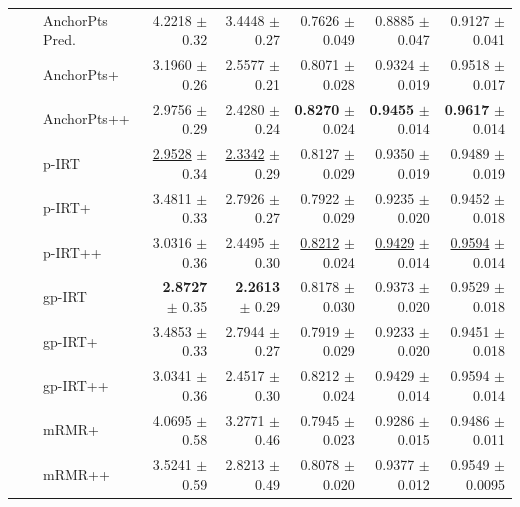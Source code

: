\begin{longtable}{llp{}rrrrr}
 &  & AnchorPts Pred. & 4.2218 {\scriptsize $\pm$ 0.32} & 3.4448 {\scriptsize $\pm$ 0.27} & 0.7626 {\scriptsize $\pm$ 0.049} & 0.8885 {\scriptsize $\pm$ 0.047} & 0.9127 {\scriptsize $\pm$ 0.041} \\
 &  & AnchorPts+ & 3.1960 {\scriptsize $\pm$ 0.26} & 2.5577 {\scriptsize $\pm$ 0.21} & 0.8071 {\scriptsize $\pm$ 0.028} & 0.9324 {\scriptsize $\pm$ 0.019} & 0.9518 {\scriptsize $\pm$ 0.017} \\
 &  & AnchorPts++ & 2.9756 {\scriptsize $\pm$ 0.29} & 2.4280 {\scriptsize $\pm$ 0.24} & \textbf{0.8270} {\scriptsize $\pm$ 0.024} & \textbf{0.9455} {\scriptsize $\pm$ 0.014} & \textbf{0.9617} {\scriptsize $\pm$ 0.014} \\
 &  & p-IRT & \underline{2.9528} {\scriptsize $\pm$ 0.34} & \underline{2.3342} {\scriptsize $\pm$ 0.29} & 0.8127 {\scriptsize $\pm$ 0.029} & 0.9350 {\scriptsize $\pm$ 0.019} & 0.9489 {\scriptsize $\pm$ 0.019} \\
 &  & p-IRT+ & 3.4811 {\scriptsize $\pm$ 0.33} & 2.7926 {\scriptsize $\pm$ 0.27} & 0.7922 {\scriptsize $\pm$ 0.029} & 0.9235 {\scriptsize $\pm$ 0.020} & 0.9452 {\scriptsize $\pm$ 0.018} \\
 &  & p-IRT++ & 3.0316 {\scriptsize $\pm$ 0.36} & 2.4495 {\scriptsize $\pm$ 0.30} & \underline{0.8212} {\scriptsize $\pm$ 0.024} & \underline{0.9429} {\scriptsize $\pm$ 0.014} & \underline{0.9594} {\scriptsize $\pm$ 0.014} \\
 &  & gp-IRT & \textbf{2.8727} {\scriptsize $\pm$ 0.35} & \textbf{2.2613} {\scriptsize $\pm$ 0.29} & 0.8178 {\scriptsize $\pm$ 0.030} & 0.9373 {\scriptsize $\pm$ 0.020} & 0.9529 {\scriptsize $\pm$ 0.018} \\
 &  & gp-IRT+ & 3.4853 {\scriptsize $\pm$ 0.33} & 2.7944 {\scriptsize $\pm$ 0.27} & 0.7919 {\scriptsize $\pm$ 0.029} & 0.9233 {\scriptsize $\pm$ 0.020} & 0.9451 {\scriptsize $\pm$ 0.018} \\
 &  & gp-IRT++ & 3.0341 {\scriptsize $\pm$ 0.36} & 2.4517 {\scriptsize $\pm$ 0.30} & 0.8212 {\scriptsize $\pm$ 0.024} & 0.9429 {\scriptsize $\pm$ 0.014} & 0.9594 {\scriptsize $\pm$ 0.014} \\
 &  & mRMR+ & 4.0695 {\scriptsize $\pm$ 0.58} & 3.2771 {\scriptsize $\pm$ 0.46} & 0.7945 {\scriptsize $\pm$ 0.023} & 0.9286 {\scriptsize $\pm$ 0.015} & 0.9486 {\scriptsize $\pm$ 0.011} \\
 &  & mRMR++ & 3.5241 {\scriptsize $\pm$ 0.59} & 2.8213 {\scriptsize $\pm$ 0.49} & 0.8078 {\scriptsize $\pm$ 0.020} & 0.9377 {\scriptsize $\pm$ 0.012} & 0.9549 {\scriptsize $\pm$ 0.0095} \\

\end{longtable}
